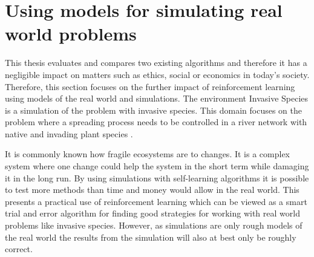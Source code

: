 \section{Using models for simulating real world problems}
\label{sec:ethics_inv_spec}

This thesis evaluates and compares two existing algorithms and therefore it has
a negligible impact on matters such as ethics, social or economics in today's
society. Therefore, this section focuses on the further impact of reinforcement learning using models of the real world and simulations. The environment Invasive Species is a simulation of the problem with invasive
species. This domain focuses on the problem where a spreading process needs to be controlled in a
river network with native and invading plant species
\parencite{invasiveSpecis2014:Online}. 

It is commonly known how fragile ecosystems are to changes. It is a complex
system where one change could help the system in the short term while damaging it in the long
run. By using simulations with self-learning algorithms it is possible to test
more methods than time and money would allow in the real world. This 
presents a practical use of reinforcement learning which can be
viewed as a smart trial and error algorithm for finding good strategies for
working with real world problems like invasive species.
However, as simulations are only rough models
of the real world the results from the simulation will also at best only be roughly
correct.
